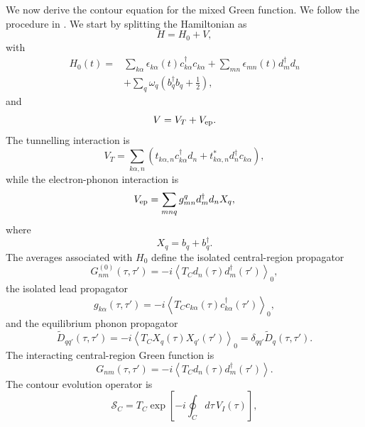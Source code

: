 \documentclass[
 reprint,
 superscriptaddress,
 amsmath,amssymb,
 aps,prb,
 longbibliography,
 floatfix
]{revtex4-2}
\begin{document}
We now derive the contour equation for the mixed Green function. We follow the procedure in \cite{Haug2008}. We start by splitting the Hamiltonian as
\begin{equation*}
H=H_0+V,
\end{equation*}
with
\begin{align*}
H_0(t)
={}&
\sum_{k\alpha}
\epsilon_{k\alpha}(t)
c_{k\alpha}^{\dagger}c_{k\alpha}
+
\sum_{mn}
\epsilon_{mn}(t)
d_m^{\dagger}d_n
\\
&+
\sum_q
\omega_q
\left(
b_q^{\dagger}b_q+\frac{1}{2}
\right),
\end{align*}
and
\begin{equation*}
V=V_T+V_{\rm ep}.
\end{equation*}
The tunnelling interaction is
\begin{equation*}
V_T
=
\sum_{k\alpha,n}
\left(
t_{k\alpha,n}
c_{k\alpha}^{\dagger}d_n
+
t_{k\alpha,n}^{*}
d_n^{\dagger}c_{k\alpha}
\right),
\end{equation*}
while the electron-phonon interaction is
\begin{equation*}
V_{\rm ep}
=
\sum_{mnq}
g_{mn}^{q}
d_m^{\dagger}d_nX_q,
\end{equation*}
where
\begin{equation*}
X_q=b_q+b_q^{\dagger}.
\end{equation*}
The averages associated with \(H_0\) define the isolated central-region propagator
\begin{equation*}
G_{nm}^{(0)}(\tau,\tau')
=
-i
\left\langle
T_C d_n(\tau)d_m^{\dagger}(\tau')
\right\rangle_0,
\end{equation*}
the isolated lead propagator
\begin{equation*}
g_{k\alpha}(\tau,\tau')
=
-i
\left\langle
T_C c_{k\alpha}(\tau)c_{k\alpha}^{\dagger}(\tau')
\right\rangle_0,
\end{equation*}
and the equilibrium phonon propagator
\begin{equation*}
\widetilde D_{qq'}(\tau,\tau')
=
-i
\left\langle
T_C X_q(\tau)X_{q'}(\tau')
\right\rangle_0
=
\delta_{qq'}\widetilde D_q(\tau,\tau').
\end{equation*}
The interacting central-region Green function is
\begin{equation}
G_{nm}(\tau,\tau')
=
-i
\left\langle
T_C d_n(\tau)d_m^{\dagger}(\tau')
\right\rangle.
\label{eq:central-G-def}
\end{equation}
The contour evolution operator is
\begin{equation*}
\mathcal S_C
=
T_C
\exp\!\left[
-i\oint_C d\tau\,V_I(\tau)
\right],
\end{equation*}
\end{document}

